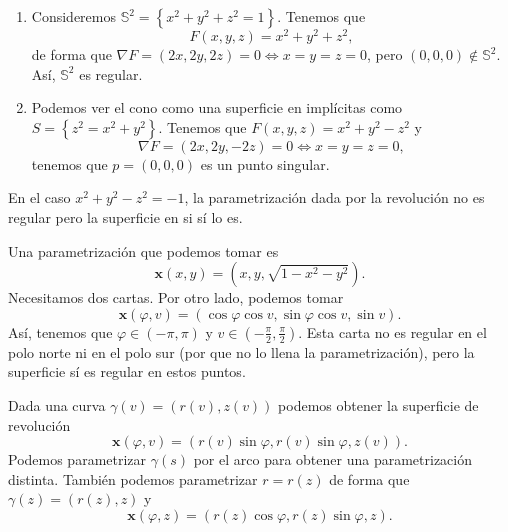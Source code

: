 \begin{eg}
\begin{enumerate}
	\item Consideremos $\displaystyle \mathbb{S}^{2}= \left\{ x^{2} +y^{2} + z^{2}=1\right\}  $. Tenemos que 
		\[F\left(x,y,z\right)=x^{2} + y^{2} +z^{2} ,\]
		de forma que $\displaystyle \nabla F = \left(2x, 2y, 2z\right) = 0 \iff x = y = z = 0 $, pero $\displaystyle \left(0,0,0\right)\not\in \mathbb{S}^{2} $. Así, $\displaystyle \mathbb{S}^{2} $ es regular.
	\item Podemos ver el cono como una superficie en implícitas como $\displaystyle S = \left\{ z^{2} = x^{2} +y^{2}\right\}  $. Tenemos que $\displaystyle F\left(x,y,z\right)=x^{2}+y^{2}-z^{2} $ y 
		\[\nabla F = \left(2x, 2y, -2z\right)= 0 \iff x = y = z = 0 ,\]
		tenemos que $\displaystyle p = \left(0,0,0\right) $ es un punto singular. 
\end{enumerate}
\end{eg}
\begin{observation}
En el caso $\displaystyle x^{2} +y^{2}-z^{2} = -1 $, la parametrización dada por la revolución no es regular pero la superficie en si sí lo es. 
\end{observation}
\begin{eg}
	Una parametrización que podemos tomar es
	\[ \textbf{x} \left(x,y\right)=\left(x,y,\sqrt{1-x^{2}-y^{2}}\right) .\]
Necesitamos dos cartas. Por otro lado, podemos tomar 
\[ \textbf{x} \left(\varphi, v\right)=\left(\cos\varphi \cos v, \sin \varphi \cos v, \sin v\right) .\]
Así, tenemos que $\displaystyle \varphi\in \left(-\pi , \pi \right) $ y $\displaystyle v \in \left(-\frac{\pi }{2}, \frac{\pi }{2}\right) $. Esta carta no es regular en el polo norte ni en el polo sur (por que no lo llena la parametrización), pero la superficie sí es regular en estos puntos.  
\end{eg}
\begin{observation}
Dada una curva $\displaystyle \gamma\left(v\right)=\left(r\left(v\right), z\left(v\right)\right) $ podemos obtener la superficie de revolución
\[ \textbf{x} \left(\varphi, v\right)=\left(r\left(v\right)\sin \varphi, r\left(v\right)\sin \varphi, z\left(v\right)\right) .\]
Podemos parametrizar $\displaystyle \gamma\left(s\right) $ por el arco para obtener una parametrización distinta. También podemos parametrizar $\displaystyle r = r\left(z\right) $ de forma que $\displaystyle \gamma \left(z\right)=\left(r\left(z\right), z\right) $ y
\[ \textbf{x} \left(\varphi, z\right)=\left(r\left(z\right)\cos\varphi, r\left(z\right)\sin\varphi, z\right) .\]
\end{observation}
